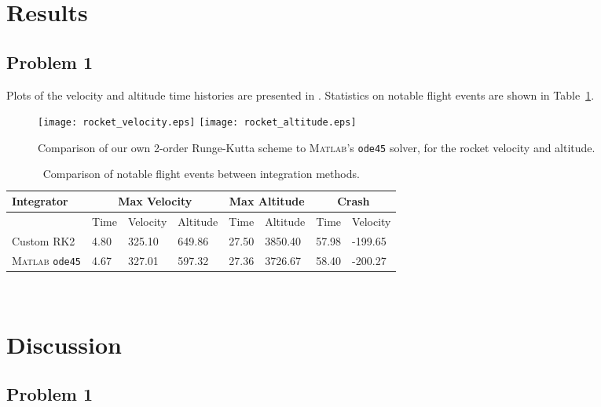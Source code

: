 \documentclass[12pt]{article}
\begin{document}
\section{Results}

\subsection{Problem 1}

Plots of the velocity and altitude time histories are presented in . Statistics on notable flight events are shown in Table~\ref{tbl:rocket}.

\begin{figure}[t]
\begin{center}
\texttt{[image: rocket\_velocity.eps]}
\texttt{[image: rocket\_altitude.eps]}
\\[6pt]
\caption{Comparison of our own 2\nd-order Runge-Kutta scheme to \textsc{Matlab}'s \lstinline|ode45| solver, for the rocket velocity and altitude.}
\label{fig:rocket_plots}
\end{center}
\end{figure}

\begin{table}[t]
\centering
\begin{tabular}{llllllll}
\toprule
Integrator   & \multicolumn{3}{c}{Max Velocity} & \multicolumn{2}{c}{Max Altitude} & \multicolumn{2}{c}{Crash} \\
\midrule
~            & Time & Velocity & Altitude       & Time         & Altitude & Time  & Velocity \\
Custom RK2   & 4.80 & 325.10   & 649.86         & 27.50        & 3850.40  & 57.98 & -199.65  \\
\textsc{Matlab} \lstinline|ode45| & 4.67 & 327.01   & 597.32         & 27.36        & 3726.67  & 58.40 & -200.27 \\
\bottomrule
\end{tabular}
\\[6pt]
\caption{Comparison of notable flight events between integration methods.}
\label{tbl:rocket}
\end{table}

\section{Discussion}

\subsection*{Problem 1}
\end{document}
